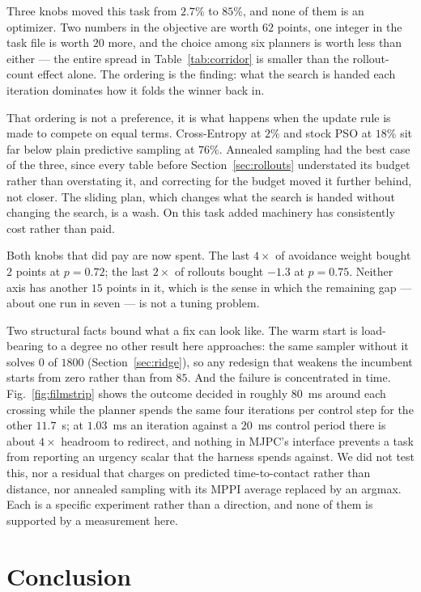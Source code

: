 \documentclass[conference]{IEEEtran}
\begin{document}
Three knobs moved this task from $2.7\%$ to $85\%$, and none of them is an
optimizer. Two numbers in the objective are worth $62$ points, one integer in
the task file is worth $20$ more, and the choice among six planners is worth
less than either --- the entire spread in Table~\ref{tab:corridor} is smaller
than the rollout-count effect alone. The ordering is the finding: what the
search is handed each iteration dominates how it folds the winner back in.

That ordering is not a preference, it is what happens when the update rule is
made to compete on equal terms. Cross-Entropy at $2\%$ and stock PSO at $18\%$
sit far below plain predictive sampling at $76\%$. Annealed sampling had the
best case of the three, since every table before Section~\ref{sec:rollouts}
understated its budget rather than overstating it, and correcting for the
budget moved it further behind, not closer. The sliding plan, which changes what
the search is handed without changing the search, is a wash. On this task added
machinery has consistently cost rather than paid.

Both knobs that did pay are now spent. The last $4\times$ of avoidance weight
bought $2$ points at $p = 0.72$; the last $2\times$ of rollouts bought $-1.3$ at
$p = 0.75$. Neither axis has another $15$ points in it, which is the sense in
which the remaining gap --- about one run in seven --- is not a tuning problem.

Two structural facts bound what a fix can look like. The warm start is
load-bearing to a degree no other result here approaches: the same sampler
without it solves $0$ of $1800$ (Section~\ref{sec:ridge}), so any redesign that
weakens the incumbent starts from zero rather than from $85$. And the failure is
concentrated in time. Fig.~\ref{fig:filmstrip} shows the outcome decided in
roughly $80$~ms around each crossing while the planner spends the same four
iterations per control step for the other $11.7$~s; at $1.03$~ms an iteration
against a $20$~ms control period there is about $4\times$ headroom to redirect,
and nothing in MJPC's interface prevents a task from reporting an urgency scalar
that the harness spends against. We did not test this, nor a residual that
charges on predicted time-to-contact rather than distance, nor annealed sampling
with its MPPI average replaced by an argmax. Each is a specific experiment
rather than a direction, and none of them is supported by a measurement here.

\section{Conclusion}
\end{document}
